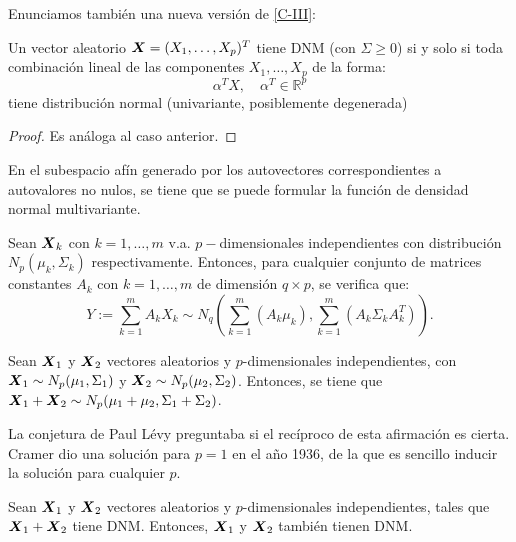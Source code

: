 Enunciamos también una nueva versión de \hyperref[posvar:car-iii]{[C-III]}:
\begin{nprop}
  Un vector aleatorio $\boldsymbol{X} = (X_1,\dots,X_p)^T$ tiene DNM (con $\Sigma \geq 0$) si y solo si toda combinación lineal de las componentes $X_1,\dots,X_p$ de la forma:
\[
  \alpha^T X, \quad \alpha^T \in \mathbb R^p
\]
tiene distribución normal (univariante, posiblemente degenerada)
\end{nprop}
\begin{proof}
Es análoga al caso anterior.
\end{proof}

\begin{ndef}
  En el subespacio afín generado por los autovectores correspondientes a autovalores no nulos, se tiene que se puede formular la función de densidad normal multivariante.
\end{ndef}

\begin{nprop}
  Sean $\boldsymbol{X}_k$ con $k = 1,\dots,m$ v.a. $p-$dimensionales independientes con distribución $N_p\left(\mu_k, \Sigma_k\right)$ respectivamente. Entonces, para cualquier conjunto de matrices constantes $A_k$ con $k = 1,\dots, m$ de dimensión $q\times p$, se verifica que:
  \[
Y:= \sum_{k=1}^{m} A_k X_k \sim N_q\left(\sum_{k=1}^m\left(A_k \mu_k\right), \sum_{k=1}^m\left(A_k \Sigma_k A_k^T\right)\right)
  .\]
\end{nprop}

\begin{nth}[Cramer]
  Sean $\boldsymbol{X}_1$ y $\boldsymbol{X}_2$ vectores aleatorios y $p$-dimensionales independientes, con $\boldsymbol{X}_1 \sim N_p(\mu_1, \Sigma_1)$ y $\boldsymbol{X}_2 \sim N_p(\mu_2, \Sigma_2)$. Entonces, se tiene que $\boldsymbol{X}_1 + \boldsymbol{X}_2 \sim N_p(\mu_1 + \mu_2, \Sigma_1 + \Sigma_2)$.
\end{nth}

La conjetura de Paul Lévy preguntaba si el recíproco de esta afirmación es cierta. Cramer dio una solución para $p=1$ en el año 1936, de la que es sencillo inducir la solución para cualquier $p$. 

\begin{nth}
  Sean $\boldsymbol{X}_1$ y $\boldsymbol{X}_2$ vectores aleatorios y $p$-dimensionales independientes, tales que $\boldsymbol{X}_1 + \boldsymbol{X}_2$ tiene DNM. Entonces, $\boldsymbol{X}_1$ y $\boldsymbol{X}_2$ también tienen DNM.
\end{nth}

